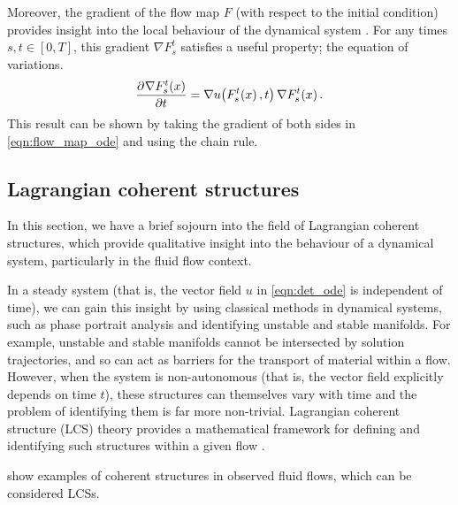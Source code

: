 Moreover, the gradient of the flow map \(F\) (with respect to the initial condition) provides insight into the local behaviour of the dynamical system \citep{Arnold_1973_OrdinaryDifferentialEquations,TruesdellNoll_2004_NonLinearFieldTheories}.
For any times \(s, t \in [0,T]\), this gradient	\(\nabla F_s^t\) satisfies a useful property; the equation of variations.
\begin{equation}
	\dpd{\nabla F_{s}^{t}\!\left(x\right)}{t} = \nabla u\!\left(F_{s}^{t}\!\left(x\right), t\right) \nabla F_{s}^{t}\!\left(x\right).
	\label{eqn:eqn_of_variations}
\end{equation}
This result can be shown by taking the gradient of both sides in \eqref{eqn:flow_map_ode} and using the chain rule.







\subsection{Lagrangian coherent structures}\label{sec:bkg_lcs}
In this section, we have a brief sojourn into the field of Lagrangian coherent structures, which provide qualitative insight into the behaviour of a dynamical system, particularly in the fluid flow context.

In a steady system (that is, the vector field \(u\) in \cref{eqn:det_ode} is independent of time), we can gain this insight by using classical methods in dynamical systems, such as phase portrait analysis and identifying unstable and stable manifolds.
For example, unstable and stable manifolds cannot be intersected by solution trajectories, and so can act as barriers for the transport of material within a flow.
However, when the system is non-autonomous (that is, the vector field explicitly depends on time \(t\)), these structures can themselves vary with time and the problem of identifying them is far more non-trivial.
Lagrangian coherent structure (LCS) theory provides a mathematical framework for defining and identifying such structures within a given flow \citep{BalasuriyaEtAl_2018_GeneralizedLagrangianCoherent}.


 show examples of coherent structures in observed fluid flows, which can be considered LCSs.

